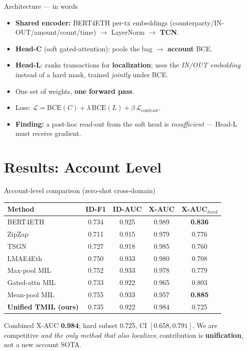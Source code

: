 \documentclass[aspectratio=169,10pt]{beamer}
\begin{document}
\begin{frame}{Architecture --- in words}
\begin{itemize}
\item \textbf{Shared encoder:} BERT4ETH per-tx embeddings (counterparty/IN-OUT/amount/count/time) $\to$ LayerNorm $\to$ \textbf{TCN}.
\item \textbf{Head-C} (soft gated-attention): pools the bag $\to$ \textbf{account} BCE.
\item \textbf{Head-L}: ranks transactions for \textbf{localization}; uses the \emph{IN/OUT embedding} instead of a hard mask, trained \emph{jointly} under BCE.
\item One set of weights, \textbf{one forward pass}.
\item Loss: $\mathcal{L}=\mathrm{BCE}(C)+\lambda\,\mathrm{BCE}(L)+\beta\,\mathcal{L}_{\text{contrast}}$.
\item \textbf{Finding:} a post-hoc read-out from the soft head is \emph{insufficient} --- Head-L must receive gradient.
\end{itemize}
\end{frame}

\section{Results: Account Level}
\begin{frame}{Account-level comparison (zero-shot cross-domain)}
\centering\small
\begin{tabular}{lcccc}\toprule
\textbf{Method} & \textbf{ID-F1} & \textbf{ID-AUC} & \textbf{X-AUC} & \textbf{X-AUC$_{hard}$}\\\midrule
BERT4ETH & 0.734 & 0.925 & 0.989 & \textbf{0.836}\\
ZipZap & 0.711 & 0.915 & 0.979 & 0.776\\
TSGN & 0.727 & 0.918 & 0.985 & 0.760\\
LMAE4Eth & 0.750 & 0.933 & 0.980 & 0.708\\
Max-pool MIL & 0.752 & 0.933 & 0.978 & 0.779\\
Gated-attn MIL & 0.733 & 0.922 & 0.965 & 0.803\\
Mean-pool MIL & 0.755 & 0.933 & 0.957 & \textbf{0.885}\\
\textbf{Unified TMIL (ours)} & 0.735 & 0.922 & 0.984 & 0.725\\\bottomrule
\end{tabular}
\vfill
\footnotesize Combined X-AUC \textbf{0.984}; hard subset 0.725, CI $[0.658,0.791]$. We are competitive \emph{and the only method that also localizes}; contribution is \textbf{unification}, not a new account SOTA.
\end{frame}
\end{document}
